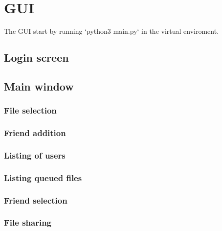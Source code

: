 \section{GUI}
The GUI start by running `python3 main.py` in the virtual enviroment.

\subsection{Login screen}

\subsection{Main window}

\subsubsection{File selection}

\subsubsection{Friend addition}

\subsubsection{Listing of users}

\subsubsection{Listing queued files}

\subsubsection{Friend selection}

\subsubsection{File sharing}